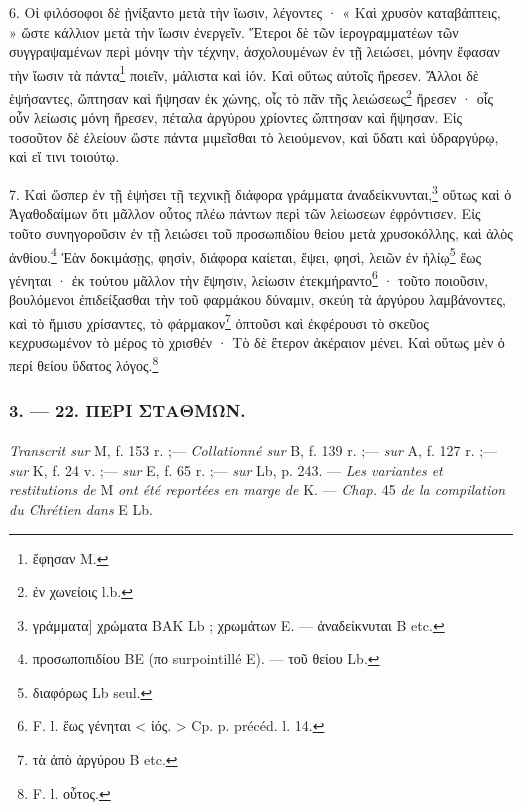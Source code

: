 \documentclass[a4paper, 11pt, oneside, polutonikogreek, french]{article}
\begin{document}
6. Οἱ φιλόσοφοι δὲ ᾐνίξαντο μετὰ τὴν ἴωσιν, λέγοντες · « Καὶ χρυσὸν καταβάπτεις, » ὥστε κάλλιον μετὰ τὴν ἴωσιν ἐνεργεῖν. Ἕτεροι δὲ τῶν ἱερογραμματέων τῶν συγγραψαμένων περὶ μόνην τὴν τέχνην, ἀσχολουμένων ἐν τῇ λειώσει, μόνην ἔφασαν τὴν ἴωσιν τὰ πάντα\footnote{ἔφησαν M.} ποιεῖν, μάλιστα καὶ ἰόν. Καὶ οὕτως αὐτοῖς ἤρεσεν. Ἄλλοι δὲ ἑψήσαντες, ὤπτησαν καὶ ἥψησαν ἐκ χώνης, οἷς τὸ πᾶν τῆς λειώσεως\footnote{ἐν χωνείοις l.b.} ἤρεσεν · οἷς οὖν λείωσις μόνη ἤρεσεν, πέταλα ἀργύρου χρίοντες ὤπτησαν καὶ ἥψησαν. Εἰς τοσοῦτον δὲ ἐλείουν ὥστε πάντα μιμεῖσθαι τὸ λειούμενον, καὶ ὕδατι καὶ ὑδραργύρῳ, καὶ εἴ τινι τοιούτῳ.

7. Καὶ ὥσπερ ἐν τῇ ἑψήσει τῇ τεχνικῇ διάφορα γράμματα ἀναδείκνυνται,\footnote{γράμματα] χρώματα BAK Lb ; χρωμάτων E. --- ἀναδείκνυται B etc.} οὕτως καὶ ὁ Ἀγαθοδαίμων ὅτι μᾶλλον οὗτος πλέω πάντων περὶ τῶν λείωσεων ἐφρόντισεν. Εἰς τοῦτο συνηγοροῦσιν ἐν τῇ λειώσει τοῦ προσωπιδίου θείου μετὰ χρυσοκόλλης, καὶ ἀλὸς ἀνθίου.\footnote{προσωποπιδίου BE (πο surpointillé E). --- τοῦ θείου Lb.} Ἐὰν δοκιμάσῃς, φησὶν, διάφορα καίεται, ἕψει, φησὶ, λειῶν ἐν ἡλίῳ\footnote{διαφόρως Lb seul.} ἕως γένηται · ἐκ τούτου μᾶλλον τὴν ἕψησιν, λείωσιν ἐτεκμήραντο\footnote{F. l. ἕως γένηται < ἰός. > Cp. p. précéd. l. 14.} · τοῦτο ποιοῦσιν, βουλόμενοι ἐπιδείξασθαι τὴν τοῦ φαρμάκου δύναμιν, σκεύη τὰ ἀργύρου λαμβάνοντες, καὶ τὸ ἥμισυ χρίσαντες, τὸ φάρμακον\footnote{τὰ ἀπὸ ἀργύρου B etc.} ὀπτοῦσι καὶ ἐκφέρουσι τὸ σκεῦος κεχρυσωμένον τὸ μέρος τὸ χρισθέν · Τὸ δὲ ἕτερον ἀκέραιον μένει. Καὶ οὕτως μὲν ὁ περί θείου ὕδατος λόγος.\footnote{F. l. οὗτος.}

\bigskip
\centerline{\EightStarTaper}
\centerline{\EightStarTaper\EightStarTaper}
\bigskip

\subsubsection{3. --- 22. ΠΕΡΙ ΣΤΑΘΜΩΝ.}
\paragraph{}
\emph{Transcrit sur} M, f. 153 r. ;--- \emph{Collationné sur} B, f. 139 r. ;--- \emph{sur} A, f. 127 r. ;--- \emph{sur} K, f. 24 v. ;--- \emph{sur} E, f. 65 r. ;--- \emph{sur} Lb, p. 243. --- \emph{Les variantes et restitutions de} M \emph{ont été reportées en marge de} K. --- \emph{Chap.} 45 \emph{de la compilation du Chrétien dans} E Lb.

\bigskip
\end{document}

